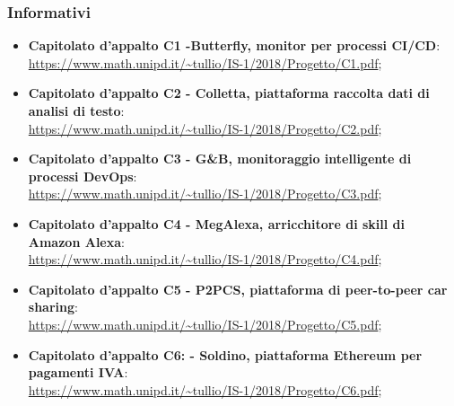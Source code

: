 \subsubsection{Informativi}
\begin{itemize}
	\item \textbf{Capitolato d'appalto C1 -Butterfly, monitor per processi CI/CD}: \\ \url{https://www.math.unipd.it/~tullio/IS-1/2018/Progetto/C1.pdf};
	
	\item \textbf{Capitolato d'appalto C2 - Colletta, piattaforma raccolta dati di analisi di testo}:\\
	\url{https://www.math.unipd.it/~tullio/IS-1/2018/Progetto/C2.pdf};
	
	\item \textbf{Capitolato d'appalto C3 - G\&B, monitoraggio intelligente di processi DevOps}:\\
	\url{https://www.math.unipd.it/~tullio/IS-1/2018/Progetto/C3.pdf};
	
	\item \textbf{Capitolato d'appalto C4 - MegAlexa, arricchitore di skill di Amazon Alexa}:\\
	\url{https://www.math.unipd.it/~tullio/IS-1/2018/Progetto/C4.pdf};
	
	\item \textbf{Capitolato d'appalto C5 - P2PCS, piattaforma di peer-to-peer car sharing}:\\
	\url{https://www.math.unipd.it/~tullio/IS-1/2018/Progetto/C5.pdf};
	
	\item \textbf{Capitolato d'appalto C6: - Soldino, piattaforma Ethereum per pagamenti IVA}:\\
	\url{https://www.math.unipd.it/~tullio/IS-1/2018/Progetto/C6.pdf};
\end{itemize}

	
	


